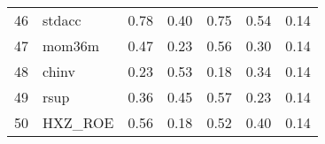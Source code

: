 \documentclass[12pt]{article}
\begin{document}
\begin{footnotesize}
\begin{longtable}{rl|c|c|c|c|c}
				46                   & stdacc                      & 0.78                             & 0.40                                                                                          & 0.75                                                                                          & 0.54                                                                                          & 0.14                                                                                                   \\
				47                   & mom36m                      & 0.47                             & 0.23                                                                                          & 0.56                                                                                          & 0.30                                                                                          & 0.14                                                                                                   \\
				48                   & chinv                       & 0.23                             & 0.53                                                                                          & 0.18                                                                                          & 0.34                                                                                          & 0.14                                                                                                   \\
				49                   & rsup                        & 0.36                             & 0.45                                                                                          & 0.57                                                                                          & 0.23                                                                                          & 0.14                                                                                                   \\
				50                   & HXZ\_ROE                    & 0.56                             & 0.18                                                                                          & 0.52                                                                                          & 0.40                                                                                          & 0.14                                                                                                   \\

\end{longtable}
\end{footnotesize}
\end{document}
